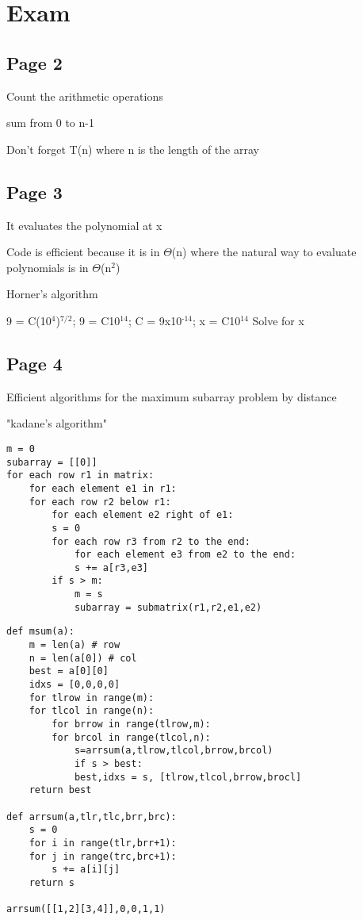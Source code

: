 \documentclass[12pt]{article}
\begin{document}
\section{Exam}
\label{sec-10}

\subsection{Page 2}
\label{sec-10-1}

Count the arithmetic operations

sum from 0 to n-1

Don't forget T(n) where n is the length of the array

\subsection{Page 3}
\label{sec-10-2}

It evaluates the polynomial at x

Code is efficient because it is in $\Theta$(n) where the natural way to
evaluate polynomials is in $\Theta$(n$^{\text{2}}$)

Horner's algorithm

9 = C(10$^{\text{4}}$)$^{\text{7/2}}$; 9 = C10$^{\text{14}}$; C = 9x10$^{\text{-14}}$; x = C10$^{\text{14}}$
Solve for x

\subsection{Page 4}
\label{sec-10-3}

Efficient algorithms for the maximum subarray problem by distance 

"kadane's algorithm"

\lstset{language=Python,label= ,caption= ,numbers=none}
\begin{lstlisting}
m = 0
subarray = [[0]]
for each row r1 in matrix:
    for each element e1 in r1:
	for each row r2 below r1:
	    for each element e2 right of e1:
		s = 0
		for each row r3 from r2 to the end:
		    for each element e3 from e2 to the end:
			s += a[r3,e3]
		if s > m:
		    m = s
		    subarray = submatrix(r1,r2,e1,e2)
\end{lstlisting}

\lstset{language=Python,label= ,caption= ,numbers=none}
\begin{lstlisting}
def msum(a):
    m = len(a) # row
    n = len(a[0]) # col
    best = a[0][0]
    idxs = [0,0,0,0]
    for tlrow in range(m):
	for tlcol in range(n):
	    for brrow in range(tlrow,m):
		for brcol in range(tlcol,n):
		    s=arrsum(a,tlrow,tlcol,brrow,brcol)
		    if s > best:
			best,idxs = s, [tlrow,tlcol,brrow,brocl]
    return best

def arrsum(a,tlr,tlc,brr,brc):
    s = 0
    for i in range(tlr,brr+1):
	for j in range(trc,brc+1):
	    s += a[i][j]
    return s

arrsum([[1,2][3,4]],0,0,1,1)
\end{lstlisting}
\end{document}

